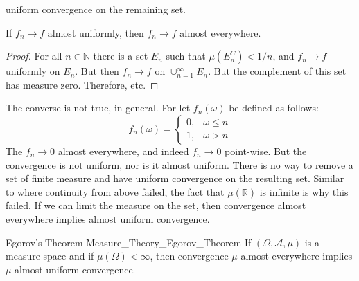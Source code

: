    uniform convergence on the remaining set.
    \begin{theorem}
        If $f_{n}\rightarrow{f}$ almost uniformly,
        then $f_{n}\rightarrow{f}$ almost everywhere.
    \end{theorem}
    \begin{proof}
        For all $n\in\mathbb{N}$ there is a set
        $E_{n}$ such that $\mu(E_{n}^{C})<1/n$, and
        $f_{n}\rightarrow{f}$ uniformly on $E_{n}$.
        But then $f_{n}\rightarrow{f}$ on
        $\cup_{n=1}^{\infty}E_{n}$. But the complement
        of this set has measure zero. Therefore, etc.
    \end{proof}
    The converse is not true, in general. For let
    $f_{n}(\omega)$ be defined as follows:
    \begin{equation}
        f_{n}(\omega)=
        \begin{cases}
            0,&\omega\leq{n}\\
            1,&\omega>n
        \end{cases}
    \end{equation}
    The $f_{n}\rightarrow{0}$ almost everywhere, and
    indeed $f_{n}\rightarrow{0}$ point-wise. But
    the convergence is not uniform, nor is it
    almost uniform. There is no way to remove a set of
    finite measure and have uniform convergence on the
    resulting set. Similar to where continuity from above
    failed, the fact that $\mu(\mathbb{R})$ is infinite
    is why this failed. If we can limit the measure on
    the set, then convergence almost everywhere implies
    almost uniform convergence.
    \begin{ftheorem}{Egorov's Theorem}
                    {Measure_Theory_Egorov_Theorem}
        If $(\Omega,\mathcal{A},\mu)$ is a measure
        space and if $\mu(\Omega)<\infty$, then
        convergence $\mu$-almost everywhere implies
        $\mu$-almost uniform convergence.
    \end{ftheorem}
